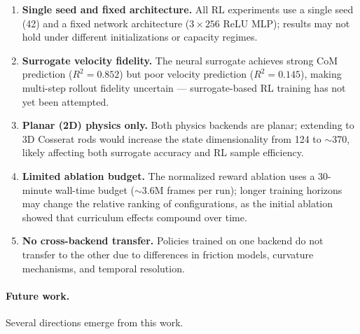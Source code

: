 \documentclass[11pt]{article}
\begin{document}
\begin{enumerate}
  \item \textbf{Single seed and fixed architecture.}
  All RL experiments use a single seed (42) and a fixed network architecture ($3 \times 256$ ReLU MLP); results may not hold under different initializations or capacity regimes.

  \item \textbf{Surrogate velocity fidelity.}
  The neural surrogate achieves strong CoM prediction ($R^2 = 0.852$) but poor velocity prediction ($R^2 = 0.145$), making multi-step rollout fidelity uncertain --- surrogate-based RL training has not yet been attempted.

  \item \textbf{Planar (2D) physics only.}
  Both physics backends are planar; extending to 3D Cosserat rods would increase the state dimensionality from 124 to ${\sim}$370, likely affecting both surrogate accuracy and RL sample efficiency.

  \item \textbf{Limited ablation budget.}
  The normalized reward ablation uses a 30-minute wall-time budget (${\sim}$3.6M frames per run); longer training horizons may change the relative ranking of configurations, as the initial ablation showed that curriculum effects compound over time.

  \item \textbf{No cross-backend transfer.}
  Policies trained on one backend do not transfer to the other due to differences in friction models, curvature mechanisms, and temporal resolution.
\end{enumerate}

\paragraph{Future work.}
Several directions emerge from this work.
\end{document}
